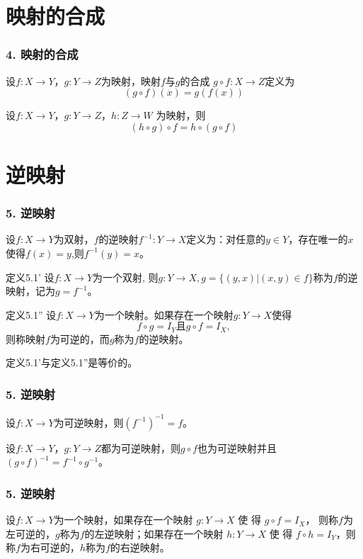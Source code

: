 \documentclass{beamer}
\begin{document}
\begin{CJK*}{UTF8}{gbsn}
\begin{frame}
\end{frame}

\section{映射的合成}
\begin{frame}
  \frametitle{4. 映射的合成}
  \begin{Def}
    设$f:X\to Y$，$g:Y\to Z$为映射，映射$f$与$g$的\alert{合成} $g\circ f:X\to Z$定义为\[(g\circ f)(x) = g(f(x))\]
  \end{Def}
  \pause
\begin{Thm}
  设$f:X \to Y$，$g:Y\to Z$，$h:Z\to W$ 为映射，则 \[ (h \circ g) \circ f = h \circ (g \circ f) \]
\end{Thm}

\end{frame}

\section{逆映射}
\begin{frame}
  \frametitle{5. 逆映射}
  \begin{Def}
     设$f:X\to Y$为双射，$f$的\alert{逆映射}$f^{-1}:Y\to X$定义为：对任意的$y\in Y$，存在唯一的$x$使得$f(x)=y$,则$f^{-1}(y)=x$。
   \end{Def}
   \pause
     \begin{block}{定义5.1'}
     设$f:X\to Y$为一个双射, 则$g:Y\to X, g=\{(y,x)|(x,y)\in f\}$称为$f$的逆映射，记为$g=f^{-1}$。
   \end{block}
        \begin{block}{定义5.1''}
     设$f:X\to Y$为一个映射。如果存在一个映射$g:Y\to X$使得\[f\circ g = I_{Y} \text{且} g\circ f = I_{X},\]则称映射$f$为可逆的，而$g$称为$f$的\alert{逆映射}。
   \end{block}

   \begin{Thm}
     定义5.1'与定义5.1''是等价的。
   \end{Thm}
\end{frame}
\begin{frame}
  \frametitle{5. 逆映射}
  \begin{Thm}
    设$f:X\to Y$为可逆映射，则$(f^{-1})^{-1}=f$。
  \end{Thm}
  \pause
  \begin{Thm}
    设$f:X\to Y$，$g:Y\to Z$都为可逆映射，则$g\circ f$也为可逆映射并且$(g\circ f)^{-1} = f^{-1}\circ g^{-1}$。
  \end{Thm}
\end{frame}
\begin{frame}
  \frametitle{5. 逆映射}
  \begin{Def}\justifying\let\raggedright\justifying
    设$f:X\to Y$为一个映射，如果存在一个映射 $g:Y\to X$ 使 得 $g\circ f = I_X$，
    则称$f$为\alert{左可逆}的，$g$称为$f$的\alert{左逆映射}；如果存在一个映射
    $h:Y\to X$ 使 得 $f\circ h=I_Y$，则称$f$为\alert{右可逆}的，$h$称为$f$的\alert{右逆映射}。
  \end{Def}
\end{frame}


\end{CJK*}
\end{document}
